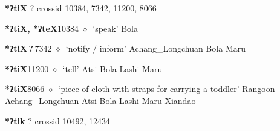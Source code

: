 \item
\textbf{*ʔtiX}
?
  {\tiny crossid 10384, 7342, 11200, 8066}
  \begin{list}{}{\leftmargin=1.5em \itemindent=-1.5em}
  \item {\footnotesize \textbf{*ʔtiX, *ʔteX}}{\tiny 10384}
         $\diamond$~`speak'
         Bola 
  \item {\footnotesize \textbf{*ʔtiX\,?\,}}{\tiny 7342}
\hspace{1ex}
         $\diamond$~`notify / inform'
         Achang\_Longchuan 
\hspace{1ex}
         Bola 
\hspace{1ex}
         Maru 
  \item {\footnotesize \textbf{*ʔtiX}}{\tiny 11200}
\hspace{1ex}
         $\diamond$~`tell'
         Atsi 
\hspace{1ex}
         Bola 
\hspace{1ex}
         Lashi 
\hspace{1ex}
         Maru 
  \item {\footnotesize \textbf{*ʔtiX}}{\tiny 8066}
\hspace{1ex}
         $\diamond$~`piece of cloth with straps for carrying a toddler'
         Rangoon 
\hspace{1ex}
         Achang\_Longchuan 
\hspace{1ex}
         Atsi 
\hspace{1ex}
         Bola 
\hspace{1ex}
         Lashi 
\hspace{1ex}
         Maru 
\hspace{1ex}
         Xiandao 
  \end{list}
\item
\textbf{*ʔtik}
?
  {\tiny crossid 10492, 12434}
